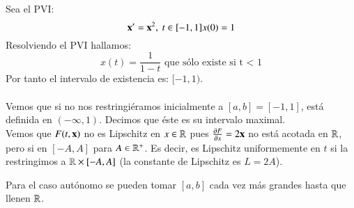 \begin{eg}
    Sea el PVI:
    $$
        \mbf{x}' = \mbf{x}^2,\ t\in[-1, 1]\\
        x(0) = 1
    $$
    Resolviendo el PVI hallamos:
    $$
        x(t) = \frac{1}{1-t} \text{ que sólo existe si t < 1}
    $$
    Por tanto el intervalo de existencia es: $[-1, 1)$.\\\\
    Vemos que si no nos restringiéramos inicialmente a $[a, b] = [-1, 1]$, está definida en $(-\infty, 1)$. Decimos que éste es su intervalo maximal.\\
    Vemos que $F(t, \mathbf{x})$ no es Lipschitz en $x\in\mathbb{R}$ pues $\frac{\partial F}{\partial x} = 2\mathbf{x}$ no está acotada en $\mathbb{R}$, pero si en $[-A, A]$ para $A \in \mathbb{R}^+$. Es decir, es Lipschitz uniformemente en $t$ si la restringimos a $\mathbb{R} \times [-A, A]$ (la constante de Lipschitz es $L = 2A$).
\end{eg}
\begin{obs}
    Para el caso autónomo se pueden tomar $[a, b]$ cada vez más grandes hasta que llenen $\mathbb{R}$.
\end{obs}

